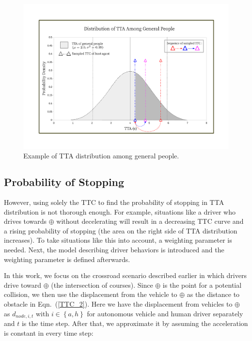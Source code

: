 \documentclass[twocolumn,10pt]{asme2e}
\begin{document}
\begin{figure}[htbp!]
\begin{center}
\includegraphics[scale=0.31]{TTC_probability_distribution.pdf}
\end{center}
\caption{Example of TTA distribution among general people.}
\label{TTC_distribution} 
\end{figure}

\subsection{Probability of Stopping}

However, using solely the TTC to find the probability of stopping in TTA distribution is not thorough enough. For example, situations like a driver who drives towards $\oplus$ without decelerating will result in a decreasing TTC curve and a rising probability of stopping (the area on the right side of TTA distribution increases). To take situations like this into account, a weighting parameter is needed. Next, the model describing driver behaviors is introduced and the weighting parameter is defined afterwards.

In this work, we focus on the crossroad scenario described earlier in which drivers drive toward $\oplus$ (the intersection of courses). Since $\oplus$ is the point for a potential collision, we then use the displacement from the vehicle to $\oplus$ as the distance to obstacle in Eqn.~(\ref{TTC_2}). Here we have the displacement from vehicles to $\oplus$ as $d_{node,i,t}$ with $i \in \left\{ {a, h}\right\}$ for autonomous vehicle and human driver separately and $t$ is the time step. After that, we approximate it by assuming the acceleration is constant in every time step:
\end{document}
